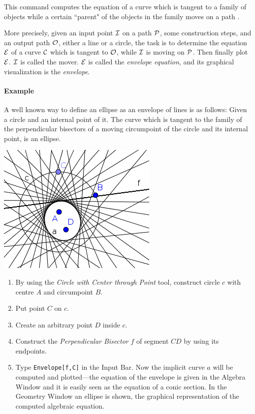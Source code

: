 \documentclass{article}
\begin{document}
This command computes the equation of a curve which is tangent to a family of objects while a certain ``parent" of the objects in the family moves on a path \cite{BotanaRecio2017}.

More precisely, given an input point $\cal{I}$ on a path $\cal{P}$, some construction steps, and an output path $\cal O$, either a line or a circle, the task is to determine the equation $\cal E$ of a curve $\cal C$ which is tangent to $\cal O$, while $\cal I$ is moving on $\cal P$. Then finally plot $\cal E$. $\cal I$ is called the mover. $\cal E$ is called the \textit{envelope equation}, and its graphical visualization is the \textit{envelope}.


\paragraph{Example} A well known way to define an ellipse as an envelope of lines is as follows:
Given a circle and an internal point of it.
The curve which is tangent to the family of the perpendicular bisectors of a moving circumpoint
of the circle and its internal point, is an ellipse.

\begin{center}
\includegraphics[scale=0.5]{Envelope-example}
\end{center}
\begin{enumerate}
    \item By using the \textit{Circle with Center through Point} tool, construct circle $c$ with centre $A$ and circumpoint $B$.
    \item Put point $C$ on $c$.
    \item Create an arbitrary point $D$ inside $c$.
    \item Construct the \textit{Perpendicular Bisector} $f$ of segment $CD$ by using its endpoints.
    \item Type \texttt{Envelope[f,C]} in the Input Bar. Now the implicit curve $a$ will be computed and plotted---the equation of the envelope is given in the Algebra Window and it is easily seen as
the equation of a conic section. In the Geometry Window an ellipse is shown, the graphical
representation of the computed algebraic equation.
\end{enumerate}
\end{document}
